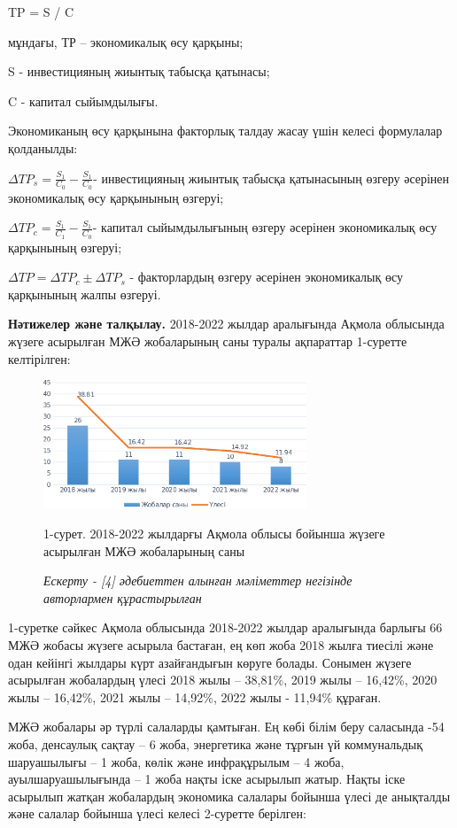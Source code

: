 \begin{multicols}{2}
TP = S / C

мұндағы, ТР -- экономикалық өсу қарқыны;

S - инвестицияның жиынтық табысқа қатынасы;

C - капитал сыйымдылығы.

Экономиканың өсу қарқынына факторлық талдау жасау үшін келесі формулалар
қолданылды:

$\Delta TP_s=\frac{S_1}{C_0}-\frac{S_1}{C_0}$- инвестицияның жиынтық табысқа
қатынасының өзгеру әсерінен экономикалық өсу қарқынының өзгеруі;

$\Delta TP_c=\frac{S_1}{C_1}-\frac{S_1}{C_0}$- капитал сыйымдылығының өзгеру
әсерінен экономикалық өсу қарқынының өзгеруі;

$\Delta TP=\Delta TP_c\pm \Delta TP_s$ - факторлардың өзгеру әсерінен
экономикалық өсу қарқынының жалпы өзгеруі.

{\bfseries Нәтижелер және талқылау.} 2018-2022 жылдар аралығында Ақмола
облысында жүзеге асырылған МЖӘ жобаларының саны туралы ақпараттар
1-суретте келтірілген:
\end{multicols}

\begin{figure}[H]
	\centering
	\includegraphics[width=0.7\textwidth]{assets/340.3}
	\caption*{1-сурет. 2018-2022 жылдарғы Ақмола облысы бойынша жүзеге
асырылған МЖӘ жобаларының саны}
	\caption*{\normalfont \emph{Ескерту - {[}4{]} әдебиеттен алынған мәліметтер негізінде
авторлармен құрастырылған}}
\end{figure}

\begin{multicols}{2}
1-суретке сәйкес Ақмола облысында 2018-2022 жылдар аралығында барлығы 66
МЖӘ жобасы жүзеге асырыла бастаған, ең көп жоба 2018 жылға тиесілі және
одан кейінгі жылдары күрт азайғандығын көруге болады. Сонымен жүзеге
асырылған жобалардың үлесі 2018 жылы -- 38,81\%, 2019 жылы -- 16,42\%,
2020 жылы -- 16,42\%, 2021 жылы -- 14,92\%, 2022 жылы - 11,94\% құраған.

МЖӘ жобалары әр түрлі салаларды қамтыған. Ең көбі білім беру саласында
-54 жоба, денсаулық сақтау -- 6 жоба, энергетика және тұрғын үй
коммунальдық шаруашылығы -- 1 жоба, көлік және инфрақұрылым -- 4 жоба,
ауылшаруашылығында -- 1 жоба нақты іске асырылып жатыр. Нақты іске
асырылып жатқан жобалардың экономика салалары бойынша үлесі де анықталды
және салалар бойынша үлесі келесі 2-суретте берілген:
\end{multicols}

